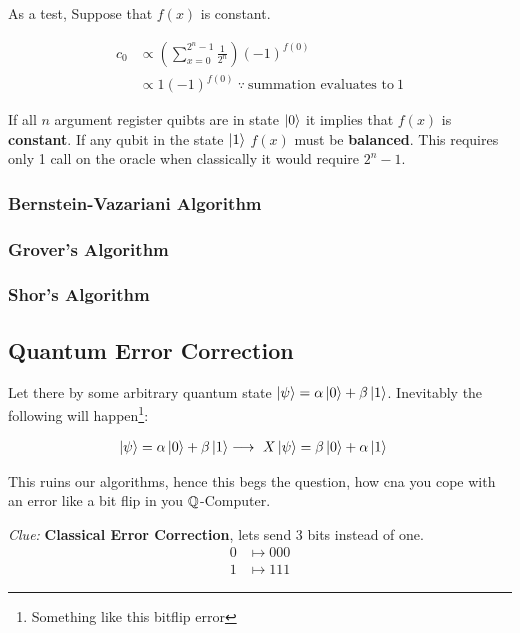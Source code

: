 \documentclass[reprint, amsmath,amssymb, aps]{revtex4-2}
\begin{document}
                As a test, Suppose that $f(x)$ is constant.

                \begin{align*}
                c_0 &\propto \left(\sum_{x=0}^{2^n - 1}\frac{1}{2^n}\right)(-1)^{f(0)} \\
                &\propto 1(-1)^{f(0)} \ \because \ \text{summation evaluates to} \ 1
                \end{align*}

                If all $n$ argument register quibts are in state $\ket{0}$ it implies that $f(x)$ is \textbf{constant}. If any qubit in the state $\ket{1}$ $f(x)$ must be \textbf{balanced}. This requires only 1 call on the oracle when classically it would require $2^n - 1$.

            \subsubsection{Bernstein-Vazariani Algorithm}

            \subsubsection{Grover's Algorithm}

            \subsubsection{Shor's Algorithm}

        \subsection{Quantum Error Correction}
            Let there by some arbitrary quantum state $\ket{\psi} = \alpha\ket{0} + \beta\ket{1}$. Inevitably the following will happen\footnote{Something like this bitflip error}:

        \begin{align*}
            \ket{\psi} = \alpha\ket{0} + \beta\ket{1} &\longrightarrow \ X\ket{\psi} = \beta\ket{0} + \alpha\ket{1}
        \end{align*}

        This ruins our algorithms, hence this begs the question, how cna you cope with an error like a bit flip in you $\mathbb{Q}$-Computer.

        \textit{Clue:}\textbf{ Classical Error Correction}, lets send 3 bits instead of one.
        \begin{align*}
            0 &\mapsto 000 \\
            1 &\mapsto 111
        \end{align*}
\end{document}
